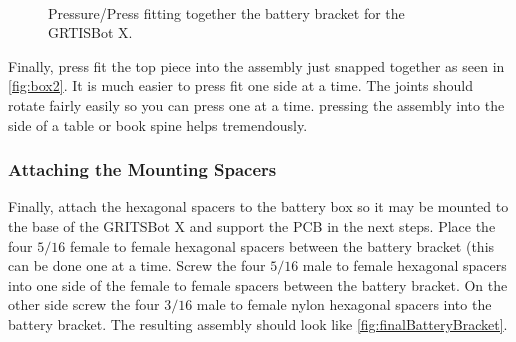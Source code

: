 \begin{figure}[h!]
\centering
{}
\hfill
{}\\
\caption{Pressure/Press fitting together the battery bracket for the GRTISBot X.}
\label{fig:batteryBox}
\end{figure}

Finally, press fit the top piece into the assembly just snapped together as seen in \cref{fig:box2}. It is much easier to press fit one side at a time. The joints should rotate fairly easily so you can press one at a time. pressing the assembly into the side of a table or book spine helps tremendously.

\subsubsection{Attaching the Mounting Spacers}
\label{sec:BBSpacers}

Finally, attach the hexagonal spacers to the battery box so it may be mounted to the base of the GRITSBot X and support the PCB in the next steps. Place the four $5/16$ female to female hexagonal spacers between the battery bracket (this can be done one at a time. Screw the four $5/16$ male to female hexagonal spacers into one side of the female to female spacers between the battery bracket. On the other side screw the four $3/16$ male to female nylon hexagonal spacers into the battery bracket. The resulting assembly should look like \cref{fig:finalBatteryBracket}.

